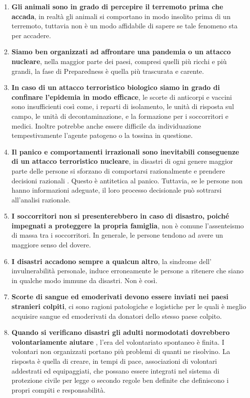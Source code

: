 \begin{enumerate}
\item\textbf{Gli animali sono in grado di percepire il terremoto prima che accada}, in realtà gli animali si comportano in modo insolito prima di un terremoto, tuttavia non è un modo affidabile di sapere se tale fenomeno sta per accadere.
\item\textbf{Siamo ben organizzati ad affrontare una pandemia o un attacco nucleare}, nella maggior parte dei paesi, compresi quelli più ricchi e più grandi, la fase di Preparedness è quella più trascurata e carente.
\item\textbf{In caso di un attacco terroristico biologico siamo in grado di confinare l'epidemia in modo efficace}, le scorte di anticorpi e vaccini sono insufficienti così come, i reparti di isolamento, le unità di risposta sul campo, le unità di decontaminazione, e la formazione per i soccorritori e medici. Inoltre potrebbe anche essere difficile da individuazione tempestivamente l'agente patogeno o la tossina in questione.
\item\textbf{Il panico e comportamenti irrazionali sono inevitabili conseguenze di un attacco terroristico nucleare}, in disastri di ogni genere maggior parte delle persone si sforzano di comportarsi razionalmente e prendere decisioni razionali . Questo è antitetica al panico. Tuttavia, se le persone non hanno informazioni adeguate, il loro processo decisionale può sottrarsi all'analisi razionale.
\item\textbf{I soccorritori non si presenterebbero in caso di disastro, poiché impegnati a proteggere la propria famiglia}, non è comune l'assenteismo di massa tra i soccorritori. In generale, le persone tendono ad avere un maggiore senso del dovere.
\item\textbf{I disastri accadono sempre a qualcun altro}, la sindrome dell' invulnerabilità personale, induce erroneamente le persone a ritenere che siano in qualche modo immune da disastri. Non è così.
\item\textbf{Scorte di sangue ed emoderivati devono essere inviati nei paesi stranieri colpiti}, ci sono ragioni patologiche e logistiche per le quali è meglio acquisire sangue ed emoderivati da donatori dello stesso paese colpito.
\item\textbf{Quando si verificano disastri gli adulti normodotati dovrebbero volontariamente aiutare }, l'era del volontariato spontaneo è finita. I volontari non organizzati portano più problemi di quanti ne risolvino. La risposta è quella di creare, in tempi di pace, associazioni di volontari addestrati ed equipaggiati, che possano essere integrati nel sistema di protezione civile per legge o secondo regole ben definite che definiscono i propri compiti e responsabilità.

\end{enumerate}
